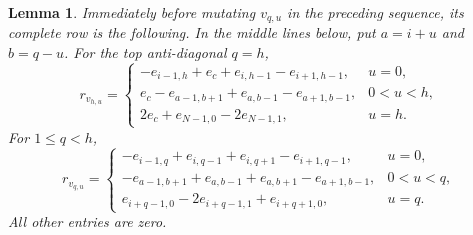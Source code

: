 \documentclass[11pt]{amsart}
\newtheorem{lemma}[theorem]{Lemma}
\theoremstyle{definition}
\theoremstyle{remark}
\begin{document}
\begin{lemma}\label{lem:anti-diagonal-row-formula}
Immediately before mutating $v_{q,u}$ in the preceding sequence, its complete
row is the following.  In the middle lines below, put $a=i+u$ and
$b=q-u$.  For the top anti-diagonal $q=h$,
\begin{equation}
 r_{v_{h,u}}=
 \begin{cases}
  -e_{i-1,h}+e_c+e_{i,h-1}-e_{i+1,h-1},&u=0,\\
  e_c-e_{a-1,b+1}+e_{a,b-1}-e_{a+1,b-1},&0<u<h,\\
  2e_c+e_{N-1,0}-2e_{N-1,1},&u=h.
 \end{cases}
 \label{eq:top-mutation-rows}
\end{equation}
For $1\le q<h$,
\begin{equation}
 r_{v_{q,u}}=
 \begin{cases}
  -e_{i-1,q}+e_{i,q-1}+e_{i,q+1}-e_{i+1,q-1},&u=0,\\
  -e_{a-1,b+1}+e_{a,b-1}+e_{a,b+1}-e_{a+1,b-1},&0<u<q,\\
  e_{i+q-1,0}-2e_{i+q-1,1}+e_{i+q+1,0},&u=q.
 \end{cases}
 \label{eq:lower-mutation-rows}
\end{equation}
All other entries are zero.
\end{lemma}
\end{document}
